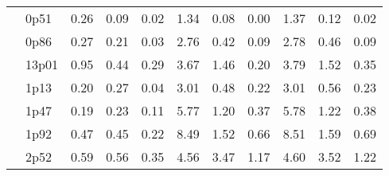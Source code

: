 \documentclass[12pt,A4paper]{article}
\begin{document}
\begin{table}[]
\begin{tabular}{lllllllllll}
\multicolumn{1}{|l|}{} & \multicolumn{1}{l|}{0p51} & \multicolumn{1}{c|}{0.26}        & \multicolumn{1}{c|}{0.09}         & \multicolumn{1}{c|}{0.02}        & \multicolumn{1}{c|}{1.34}         & \multicolumn{1}{c|}{0.08}        & \multicolumn{1}{c|}{0.00}        & \multicolumn{1}{c|}{1.37}        & \multicolumn{1}{c|}{0.12}        & \multicolumn{1}{c|}{0.02}         \\ \cline{2-11}
\multicolumn{1}{|l|}{} & \multicolumn{1}{l|}{0p86} & \multicolumn{1}{c|}{0.27}        & \multicolumn{1}{c|}{0.21}         & \multicolumn{1}{c|}{0.03}        & \multicolumn{1}{c|}{2.76}         & \multicolumn{1}{c|}{0.42}        & \multicolumn{1}{c|}{0.09}        & \multicolumn{1}{c|}{2.78}        & \multicolumn{1}{c|}{0.46}        & \multicolumn{1}{c|}{0.09}         \\ \cline{2-11}
\multicolumn{1}{|l|}{} & \multicolumn{1}{l|}{13p01} & \multicolumn{1}{c|}{0.95}        & \multicolumn{1}{c|}{0.44}         & \multicolumn{1}{c|}{0.29}        & \multicolumn{1}{c|}{3.67}         & \multicolumn{1}{c|}{1.46}        & \multicolumn{1}{c|}{0.20}        & \multicolumn{1}{c|}{3.79}        & \multicolumn{1}{c|}{1.52}        & \multicolumn{1}{c|}{0.35}         \\ \cline{2-11}
\multicolumn{1}{|l|}{} & \multicolumn{1}{l|}{1p13} & \multicolumn{1}{c|}{0.20}        & \multicolumn{1}{c|}{0.27}         & \multicolumn{1}{c|}{0.04}        & \multicolumn{1}{c|}{3.01}         & \multicolumn{1}{c|}{0.48}        & \multicolumn{1}{c|}{0.22}        & \multicolumn{1}{c|}{3.01}        & \multicolumn{1}{c|}{0.56}        & \multicolumn{1}{c|}{0.23}         \\ \cline{2-11}
\multicolumn{1}{|l|}{} & \multicolumn{1}{l|}{1p47} & \multicolumn{1}{c|}{0.19}        & \multicolumn{1}{c|}{0.23}         & \multicolumn{1}{c|}{0.11}        & \multicolumn{1}{c|}{5.77}         & \multicolumn{1}{c|}{1.20}        & \multicolumn{1}{c|}{0.37}        & \multicolumn{1}{c|}{5.78}        & \multicolumn{1}{c|}{1.22}        & \multicolumn{1}{c|}{0.38}         \\ \cline{2-11}
\multicolumn{1}{|l|}{} & \multicolumn{1}{l|}{1p92} & \multicolumn{1}{c|}{0.47}        & \multicolumn{1}{c|}{0.45}         & \multicolumn{1}{c|}{0.22}        & \multicolumn{1}{c|}{8.49}         & \multicolumn{1}{c|}{1.52}        & \multicolumn{1}{c|}{0.66}        & \multicolumn{1}{c|}{8.51}        & \multicolumn{1}{c|}{1.59}        & \multicolumn{1}{c|}{0.69}         \\ \cline{2-11}
\multicolumn{1}{|l|}{} & \multicolumn{1}{l|}{2p52} & \multicolumn{1}{c|}{0.59}        & \multicolumn{1}{c|}{0.56}         & \multicolumn{1}{c|}{0.35}        & \multicolumn{1}{c|}{4.56}         & \multicolumn{1}{c|}{3.47}        & \multicolumn{1}{c|}{1.17}        & \multicolumn{1}{c|}{4.60}        & \multicolumn{1}{c|}{3.52}        & \multicolumn{1}{c|}{1.22}         \\ \cline{2-11}

\end{tabular}
\end{table}
\end{document}

